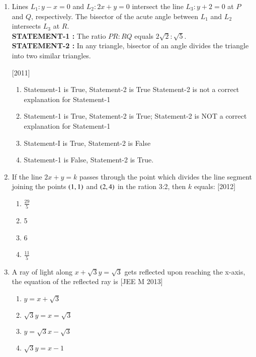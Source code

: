 \documentclass[journal,12pt,twocolumn]{IEEEtran}
\theoremstyle{remark}
\begin{document}
\begin{enumerate}
\item Lines $L_{1}: y-x=0$ and $L_{2}: 2x+y=0$ intersect the line $L_{3}: y+2=0$ at $P$ and $Q$, respectively. The bisector of the acute 
angle between $L_{1}$ and $L_{2}$ intersects $L_{3}$ at $R$.\\
\textbf{STATEMENT-1 :} The ratio $PR:RQ$ equals $2\sqrt{2}:\sqrt{5}$.\\
\textbf{STATEMENT-2 :} In any triangle, bisector of an angle divides the triangle into two similar triangles.

\hfill{[2011]}
   \begin{enumerate}[label=(\alph*)]
   \item Statement-1 is True, Statement-2 is True Statement-2 
is not a correct explanation for Statement-1 
   \item Statement-1 is True, Statement-2 is True; Statement-2 
is NOT a correct explanation for Statement-1 
   \item Statement-I is True, Statement-2 is False
   \item Statement-1 is False, Statement-2 is True. 
   \end{enumerate}

\item If the line $2x+y=k$ passes through the point which divides the line segment joining the points $\left(1, 1\right)$ and $\left(2, 4\right)$ in the ration 3:2, then $k$ equals: \hfill{[2012]}
\begin{multicols}{4}
\begin{enumerate}[label=(\alph*)]
\item $\frac{29}{5}$
\item 5
\item 6
\item $\frac{11}{5}$
\end{enumerate}
\end{multicols} 

\item A ray of light along $x+\sqrt{3}y=\sqrt{3}$ gets reflected upon reaching the x-axis, the equation of the reflected ray is \hfill{[JEE M 2013]}
\begin{multicols}{2}
\begin{enumerate}[label=(\alph*)]
\item $y=x+\sqrt{3}$
\item $\sqrt{3}y=x=\sqrt{3}$
\item $y=\sqrt{3}x-\sqrt{3}$
\item $\sqrt{3}y=x-1$
\end{enumerate}
\end{multicols}


\end{enumerate}
\end{document}
